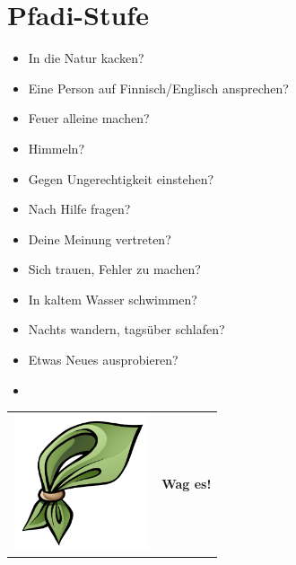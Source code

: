 \section*{Pfadi-Stufe}

\begin{itemize}
	\item In die Natur kacken?
	\item Eine Person auf Finnisch/Englisch ansprechen?
	\item Feuer alleine machen?
	\item Himmeln?
	\item Gegen Ungerechtigkeit einstehen?
	\item Nach Hilfe fragen?
	\item Deine Meinung vertreten?
	\item Sich trauen, Fehler zu machen?
	\item In kaltem Wasser schwimmen?
	\item Nachts wandern, tagsüber schlafen?
	\item Etwas Neues ausprobieren?
	\item \hrulefill
\end{itemize}
\vspace{2em}


\vfill
\begin{center}
	\begin{tabular}{m{3cm} m{5cm}}
			\includegraphics[height=4cm]{Ausgaben/Sola24/Grafiken/lebensstil.png} & \Huge \textbf{Wag es!}
	\end{tabular}
\end{center}